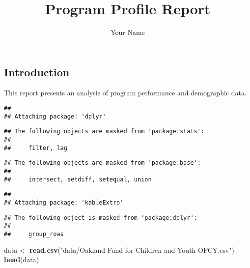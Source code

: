\documentclass[
]{article}
\title{Program Profile Report}
\author{Your Name}
\date{}
\newenvironment{Shaded}{\begin{snugshade}}{\end{snugshade}}
\newcommand{\FunctionTok}[1]{\textcolor[rgb]{0.13,0.29,0.53}{\textbf{#1}}}
\newcommand{\NormalTok}[1]{#1}
\newcommand{\OtherTok}[1]{\textcolor[rgb]{0.56,0.35,0.01}{#1}}
\newcommand{\StringTok}[1]{\textcolor[rgb]{0.31,0.60,0.02}{#1}}
\begin{document}
\maketitle

\subsection{Introduction}\label{introduction}

This report presents an analysis of program performance and demographic
data.

\begin{verbatim}
## 
## Attaching package: 'dplyr'
\end{verbatim}

\begin{verbatim}
## The following objects are masked from 'package:stats':
## 
##     filter, lag
\end{verbatim}

\begin{verbatim}
## The following objects are masked from 'package:base':
## 
##     intersect, setdiff, setequal, union
\end{verbatim}

\begin{verbatim}
## 
## Attaching package: 'kableExtra'
\end{verbatim}

\begin{verbatim}
## The following object is masked from 'package:dplyr':
## 
##     group_rows
\end{verbatim}

\begin{Shaded}
\begin{Highlighting}[]
\NormalTok{data }\OtherTok{\textless{}{-}} \FunctionTok{read.csv}\NormalTok{(}\StringTok{"data/Oakland Fund for Children and Youth OFCY.csv"}\NormalTok{)}
\FunctionTok{head}\NormalTok{(data)}
\end{Highlighting}
\end{Shaded}
\end{document}
